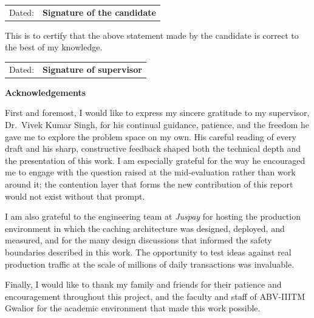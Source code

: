 \documentclass[12pt,a4paper,oneside]{report}
\begin{document}
\vspace{1cm}
\begin{center}
\begin{tabular}{p{}p{}}
Dated:  & {\bf{Signature of the candidate}} \\
\end{tabular}
\end{center}

\vspace{1.5cm}
\noindent This is to certify that the above statement made by the candidate is correct to the best of my knowledge.

\vspace{1.5cm}
\begin{center}
\begin{tabular}{p{}p{}}
Dated: & {\bf{Signature of supervisor}} \\
\end{tabular}
\end{center}
\clearpage

\thispagestyle{empty}
\begin{center}
{\LARGE \bf Acknowledgements}
\end{center}
\noindent
First and foremost, I would like to express my sincere gratitude to my supervisor, Dr.\ Vivek Kumar Singh, for his continual guidance, patience, and the freedom he gave me to explore the problem space on my own. His careful reading of every draft and his sharp, constructive feedback shaped both the technical depth and the presentation of this work. I am especially grateful for the way he encouraged me to engage with the question raised at the mid-evaluation rather than work around it; the contention layer that forms the new contribution of this report would not exist without that prompt.

I am also grateful to the engineering team at \emph{Juspay} for hosting the production environment in which the caching architecture was designed, deployed, and measured, and for the many design discussions that informed the safety boundaries described in this work. The opportunity to test ideas against real production traffic at the scale of millions of daily transactions was invaluable.

Finally, I would like to thank my family and friends for their patience and encouragement throughout this project, and the faculty and staff of ABV-IIITM Gwalior for the academic environment that made this work possible.
\end{document}
